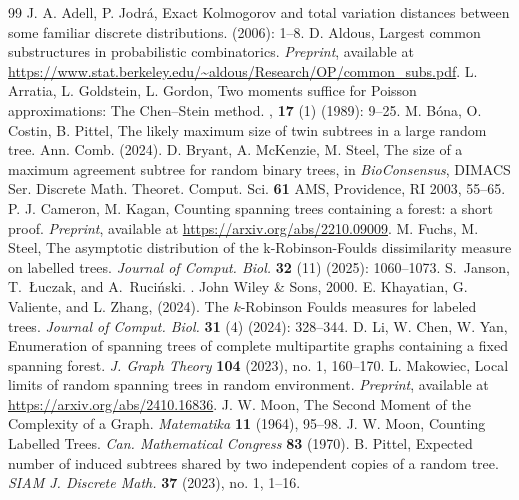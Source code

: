 \documentclass[a4paper,12pt,reqno]{amsart}
\theoremstyle{remark}
\begin{document}
\begin{thebibliography}{99}
 J. A. Adell, P. Jodr\'a,
\newblock Exact Kolmogorov and total variation distances between some familiar discrete distributions.
 (2006): 1--8.
 D. Aldous, Largest common substructures in probabilistic combinatorics. {\em Preprint}, available at 
\url{https://www.stat.berkeley.edu/~aldous/Research/OP/common_subs.pdf}.
 L. Arratia, L. Goldstein, L. Gordon,
 \newblock Two moments suffice for Poisson approximations: The Chen--Stein method.
 , {\bf 17} (1) (1989): 9--25.
 M. B\'ona, O. Costin, B. Pittel, The likely maximum size of  twin subtrees in a large random tree.  Ann. Comb. (2024).
 D. Bryant, A. McKenzie, M. Steel, The size of a maximum agreement subtree for random binary trees, 
in {\em BioConsensus}, DIMACS Ser. Discrete Math. Theoret. Comput. Sci. {\bf 61} AMS, Providence, RI 2003, 55--65.
  P. J. Cameron, M. Kagan, Counting spanning trees containing a forest: a short proof. {\em Preprint}, available at \url{https://arxiv.org/abs/2210.09009}.
 M. Fuchs, M. Steel,  The asymptotic distribution of the k-Robinson-Foulds dissimilarity measure on labelled trees. {\em Journal of Comput. Biol.} {\bf 32} (11) (2025): 1060--1073.
 S.~Janson, T.~{\relax\L{}}uczak, and A.~Ruci{\'n}ski. . \newblock John Wiley \& Sons, 2000.
 E. Khayatian, G. Valiente, and L. Zhang, (2024). The $k$-Robinson Foulds measures for labeled trees. {\em Journal of Comput. Biol.} {\bf 31} (4) (2024): 328--344.
 D. Li, W. Chen, W. Yan, Enumeration of spanning trees of complete multipartite graphs containing a fixed spanning forest. {\em J. Graph Theory} {\bf 104} (2023), no. 1, 160--170.
 L. Makowiec, Local limits of random spanning trees in random environment. {\em Preprint}, available at \url{https://arxiv.org/abs/2410.16836}.
 J. W. Moon, The Second Moment of the Complexity of a Graph. {\em Matematika} {\bf 11} (1964), 95--98.
 J. W. Moon, Counting Labelled Trees. {\em Can. Mathematical Congress} {\bf 83} (1970).
 B. Pittel, Expected number of induced subtrees shared by two independent copies of a random tree.
{\em SIAM J. Discrete Math.} {\bf 37} (2023), no. 1, 1--16.
\end{thebibliography}
\end{document}
